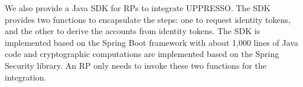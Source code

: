 


We also provide a Java SDK for RPs to integrate UPPRESSO.
The SDK provides two functions to encapsulate the steps:
 one to request identity tokens,
    and the other to derive the accounts from identity tokens.
The SDK is implemented based on the Spring Boot framework  with about 1,000 lines of Java code
 and cryptographic computations are implemented based on the Spring Security library.
An RP only needs to invoke these two functions for the integration.


